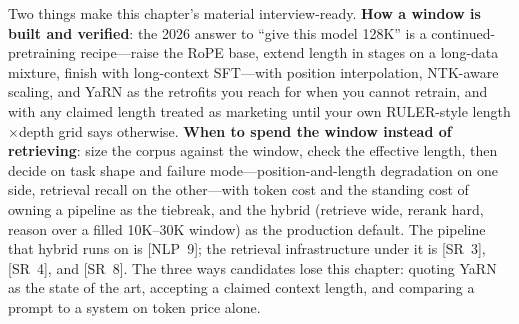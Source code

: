 \begin{keyinsight}
Two things make this chapter's material interview-ready. \textbf{How a window is built and verified}: the 2026 answer to ``give this model 128K'' is a continued-pretraining recipe---raise the RoPE base, extend length in stages on a long-data mixture, finish with long-context SFT---with position interpolation, NTK-aware scaling, and YaRN as the retrofits you reach for when you cannot retrain, and with any claimed length treated as marketing until your own RULER-style length$\times$depth grid says otherwise. \textbf{When to spend the window instead of retrieving}: size the corpus against the window, check the effective length, then decide on task shape and failure mode---position-and-length degradation on one side, retrieval recall on the other---with token cost and the standing cost of owning a pipeline as the tiebreak, and the hybrid (retrieve wide, rerank hard, reason over a filled 10K--30K window) as the production default. The pipeline that hybrid runs on is [NLP~9]; the retrieval infrastructure under it is [SR~3], [SR~4], and [SR~8]. The three ways candidates lose this chapter: quoting YaRN as the state of the art, accepting a claimed context length, and comparing a prompt to a system on token price alone.
\end{keyinsight}
